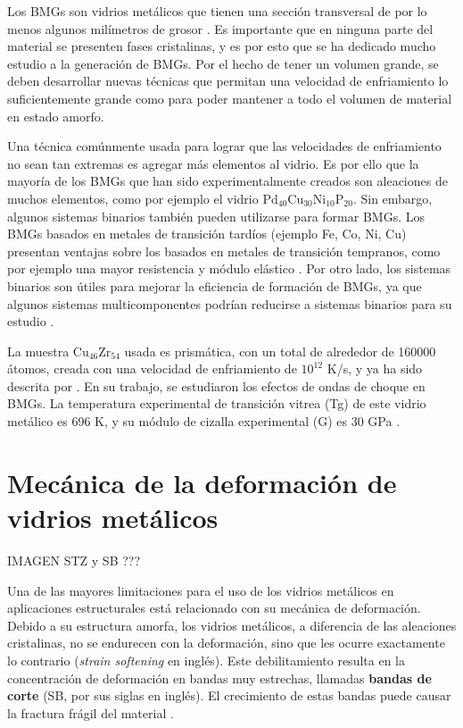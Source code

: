 Los BMGs son vidrios metálicos que tienen una sección transversal de por lo menos algunos milímetros de grosor \citep{suryana11}. Es importante que en ninguna parte del material se presenten fases cristalinas, y es por esto que se ha dedicado mucho estudio a la generación de BMGs. Por el hecho de tener un volumen grande, se deben desarrollar nuevas técnicas que permitan una velocidad de enfriamiento lo suficientemente grande como para poder mantener a todo el volumen de material en estado amorfo.

Una técnica comúnmente usada para lograr que las velocidades de enfriamiento no sean tan extremas es agregar más elementos al vidrio. Es por ello que la mayoría de los BMGs que han sido experimentalmente creados son aleaciones de muchos elementos, como por ejemplo el vidrio Pd$_{40}$Cu$_{30}$Ni$_{10}$P$_{20}$. Sin embargo, algunos sistemas binarios también pueden utilizarse para formar BMGs. Los BMGs basados en metales de transición tardíos (ejemplo Fe, Co, Ni, Cu) presentan ventajas sobre los basados en metales de transición tempranos, como por ejemplo una mayor resistencia y módulo elástico \citep{Xu04}. Por otro lado, los sistemas binarios son útiles para mejorar la eficiencia de formación de BMGs, ya que algunos sistemas multicomponentes podrían reducirse a sistemas binarios para su estudio \citep{Duan05}.

La muestra Cu$_{46}$Zr$_{54}$ usada es prismática, con un total de alrededor de 160000 átomos, creada con una velocidad de enfriamiento de $10^{12}$ K/s, y ya ha sido descrita por \cite{arman10}. En su trabajo, se estudiaron los efectos de ondas de choque en BMGs. La temperatura experimental de transición vitrea (Tg) de este vidrio metálico es 696 K, y su módulo de cizalla experimental (G) es 30 GPa \citep{johnson05}. 


\section{Mecánica de la deformación de vidrios metálicos}
\label{S1_5}

IMAGEN STZ y SB ???

Una de las mayores limitaciones para el uso de los vidrios metálicos en aplicaciones estructurales está relacionado con su mecánica de deformación. Debido a su estructura amorfa, los vidrios metálicos, a diferencia de las aleaciones cristalinas, no se endurecen con la deformación, sino que les ocurre exactamente lo contrario (\textit{strain softening} en inglés). Este debilitamiento resulta en la concentración de deformación en bandas muy estrechas, llamadas \textbf{bandas de corte} (SB, por sus siglas en inglés). El crecimiento de estas bandas puede causar la fractura frágil del material \citep{schuh07}.

